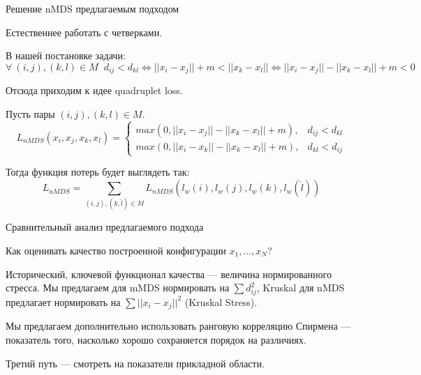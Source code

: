 \documentclass[9pt]{beamer}
\begin{document}
\begin{frame}{Решение nMDS предлагаемым подходом}

Естественнее работать с четверками. 
\vspace{\baselineskip} 

В нашей постановке задачи: $
            \forall \: (i, j), (k,l) \in M \; \; d_{ij} < d_{kl} \Longleftrightarrow ||x_i - x_j|| + m < ||x_k - x_l||
            \Longleftrightarrow ||x_i - x_j|| - ||x_k - x_l||+ m < 0 
$
\vspace{\baselineskip} 

Отсюда приходим к идее quadruplet loss.
\vspace{\baselineskip} 

Пусть пары $(i, j), (k, l) \in M$.
\begin{equation}
    L_{nMDS}(x_i, x_j, x_k, x_l) = \begin{cases}
                max(0, ||x_i - x_j|| - ||x_k - x_l|| + m),& d_{ij} < d_{kl}\\
                max(0, ||x_i - x_k|| - ||x_k - x_l|| + m), & d_{kl} < d_{ij}
                        \end{cases}
\end{equation}

Тогда функция потерь будет выглядеть так:
\begin{equation}
    L_{nMDS} = \sum_{(i, j), (k, \hat{l}) \in M} L_{nMDS}(l_w(i), l_w(j), l_w(k), l_w(\hat{l})) 
\end{equation}
    
\end{frame}

\begin{frame}{Сравнительный анализ предлагаемого подхода}

Как оценивать качество построенной конфигурации $x_1, ..., x_N$?
\vspace{\baselineskip} 

Исторический, ключевой функционал качества --- величина нормированного стресса. Мы предлагаем для mMDS  нормировать на $\sum d_{ij}^2$, Kruskal для nMDS предлагает нормировать на $\sum ||x_i - x_j||^2$ (Kruskal Stress).
\vspace{\baselineskip} 

Мы предлагаем дополнительно использовать ранговую корреляцию Спирмена --- показатель того, насколько хорошо сохраняется порядок на различиях.
\vspace{\baselineskip} 

Третий путь --- смотреть на показатели прикладной области.

\end{frame}
\end{document}
